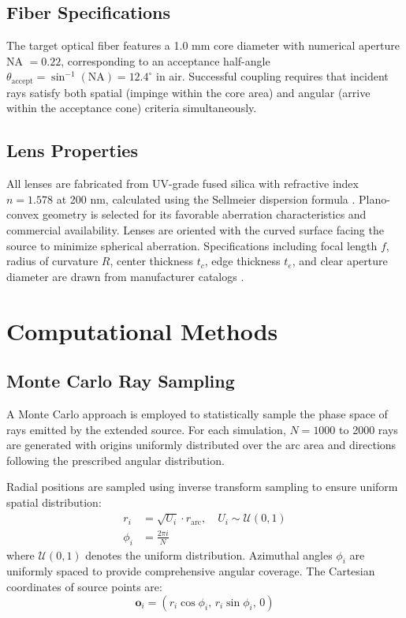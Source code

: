 \subsection{Fiber Specifications}

The target optical fiber features a 1.0 mm core diameter with numerical aperture NA $= 0.22$, corresponding to an acceptance half-angle $\theta_{\text{accept}} = \sin^{-1}(\text{NA}) = 12.4^\circ$ in air. Successful coupling requires that incident rays satisfy both spatial (impinge within the core area) and angular (arrive within the acceptance cone) criteria simultaneously.

\subsection{Lens Properties}

All lenses are fabricated from UV-grade fused silica with refractive index $n = 1.578$ at 200 nm, calculated using the Sellmeier dispersion formula \cite{malitson1965}. Plano-convex geometry is selected for its favorable aberration characteristics and commercial availability. Lenses are oriented with the curved surface facing the source to minimize spherical aberration. Specifications including focal length $f$, radius of curvature $R$, center thickness $t_c$, edge thickness $t_e$, and clear aperture diameter are drawn from manufacturer catalogs \cite{thorlabs,edmundoptics}.

\section{Computational Methods}

\subsection{Monte Carlo Ray Sampling}

A Monte Carlo approach is employed to statistically sample the phase space of rays emitted by the extended source. For each simulation, $N = 1000$ to 2000 rays are generated with origins uniformly distributed over the arc area and directions following the prescribed angular distribution.

Radial positions are sampled using inverse transform sampling to ensure uniform spatial distribution:
\begin{align}
r_i &= \sqrt{U_i} \cdot r_{\text{arc}}, \quad U_i \sim \mathcal{U}(0,1) \\
\phi_i &= \frac{2\pi i}{N}
\end{align}
where $\mathcal{U}(0,1)$ denotes the uniform distribution. Azimuthal angles $\phi_i$ are uniformly spaced to provide comprehensive angular coverage. The Cartesian coordinates of source points are:
\begin{equation}
\mathbf{o}_i = (r_i \cos\phi_i, \, r_i \sin\phi_i, \, 0)
\end{equation}

